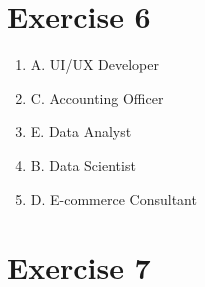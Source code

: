 \documentclass[12pt,titlepage]{article}
\begin{document}
\section*{Exercise 6}
\begin{enumerate}
    \item A. UI/UX Developer
    \item C. Accounting Officer
    \item E. Data Analyst
    \item B. Data Scientist
    \item D. E-commerce Consultant
\end{enumerate}

\section*{Exercise 7}
\end{document}
